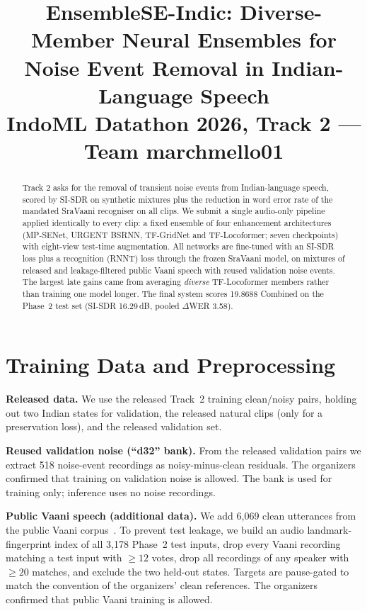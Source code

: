 \documentclass[conference]{IEEEtran}
\begin{document}
\title{EnsembleSE-Indic: Diverse-Member Neural Ensembles for\\Noise Event Removal in Indian-Language Speech\\
{\large IndoML Datathon 2026, Track 2 --- Team marchmello01}}

\author{
}

\maketitle

\begin{abstract}
Track 2 asks for the removal of transient noise events from Indian-language speech, scored by SI-SDR on synthetic
mixtures plus the reduction in word error rate of the mandated SraVaani recogniser on all clips. We submit a single
audio-only pipeline applied identically to every clip: a fixed ensemble of four enhancement architectures
(MP-SENet, URGENT BSRNN, TF-GridNet and TF-Locoformer; seven checkpoints) with eight-view test-time augmentation.
All networks are fine-tuned with an SI-SDR loss plus a recognition (RNNT) loss through the frozen SraVaani model, on
mixtures of released and leakage-filtered public Vaani speech with reused validation noise events. The largest late
gains came from averaging \emph{diverse} TF-Locoformer members rather than training one model longer. The final
system scores 19.8688 Combined on the Phase~2 test set (SI-SDR 16.29\,dB, pooled $\Delta$WER 3.58).
\end{abstract}

\section{Training Data and Preprocessing}
\textbf{Released data.} We use the released Track~2 training clean/noisy pairs, holding out two Indian states for
validation, the released natural clips (only for a preservation loss), and the released validation set.

\textbf{Reused validation noise (``d32'' bank).} From the released validation pairs we extract 518 noise-event
recordings as noisy-minus-clean residuals. The organizers confirmed that training on validation noise is allowed.
The bank is used for training only; inference uses no noise recordings.

\textbf{Public Vaani speech (additional data).} We add 6{,}069 clean utterances from the public Vaani
corpus~\cite{vaani}. To prevent test leakage, we build an audio landmark-fingerprint index of all 3{,}178 Phase~2
test inputs, drop every Vaani recording matching a test input with $\geq 12$ votes, drop all recordings of any speaker
with $\geq 20$ matches, and exclude the two held-out states. Targets are pause-gated to match the convention of the
organizers' clean references. The organizers confirmed that public Vaani training is allowed.
\end{document}
